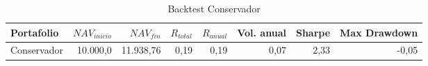 \begin{table}[htbp]
\centering
\begin{tabular}{lrrrrrrr}
\hline
Portafolio & $NAV_{inicio}$ & $NAV_{fin}$ & $R_{total}$ & $R_{anual}$ & Vol. anual & Sharpe & Max Drawdown \\
\hline
Conservador & 10{.}000{,}0 & 11{.}938{,}76 & 0{,}19 & 0{,}19 & 0{,}07 & 2{,}33 & -0{,}05 \\
\hline
\end{tabular}
\caption{Backtest Conservador}
\label{tab:backtest-conservative}
\end{table}